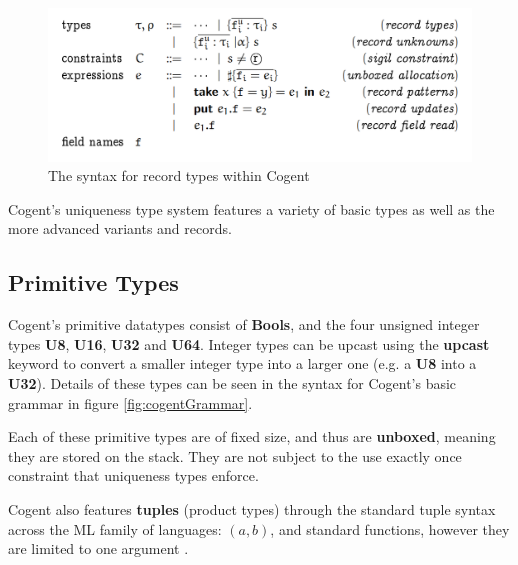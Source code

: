 \begin{figure}
    \centering
    \includegraphics[width=400pt]{content/RecordGrammar.png}
    \caption{The syntax for record types within Cogent~\citep{ICFPCogent}}
    \label{fig:recordGrammar}
\end{figure}



Cogent's uniqueness type system features a variety of basic types as well as the more advanced variants
and records.

\subsection{Primitive Types}

Cogent's primitive datatypes consist of \textbf{Bools}, and the four unsigned integer types \textbf{U8}, 
\textbf{U16}, \textbf{U32} and \textbf{U64}. Integer types can be upcast using the \textbf{upcast}
keyword to convert a smaller integer type into a larger one (e.g. a \textbf{U8} into a \textbf{U32}).
Details of these types can be seen in the syntax for Cogent's basic grammar in figure \ref{fig:cogentGrammar}.

Each of these primitive types are of fixed size, and thus are \textbf{unboxed}, meaning they are stored on the
stack. They are not subject to the use exactly once constraint that uniqueness types enforce. 

Cogent also features \textbf{tuples}  (product types) through the standard tuple syntax across the ML
family of languages: $(a,b)$, and standard functions, however they are limited to one argument .

